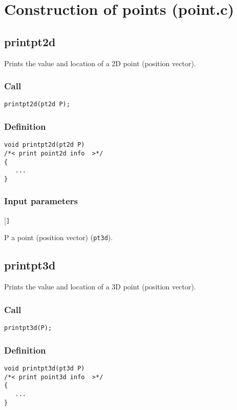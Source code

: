 \section{Construction of points (point.c)}\label{sec:point.c}




\subsection{{printpt2d}}
Prints the value and location of a 2D point (position vector).

\subsubsection*{Call}
\begin{verbatim}printpt2d(pt2d P);\end{verbatim}

\subsubsection*{Definition}
\begin{verbatim}
void printpt2d(pt2d P)
/*< print point2d info  >*/
{
   ...
}
\end{verbatim}

\subsubsection*{Input parameters}
\begin{desclist}{\tt }{\quad}[\tt ]
   \setlength\itemsep{0pt}
   \item[P] a point (position vector) (\texttt{pt3d}).     
\end{desclist}




\subsection{{printpt3d}}
Prints the value and location of a 3D point (position vector).

\subsubsection*{Call}
\begin{verbatim}printpt3d(P);\end{verbatim}

\subsubsection*{Definition}
\begin{verbatim}
void printpt3d(pt3d P)
/*< print point3d info  >*/
{
   ...
}
\end{verbatim}

